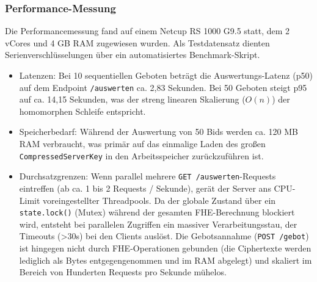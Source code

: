 \subsubsection{Performance-Messung}
Die Performancemessung fand auf einem Netcup RS 1000 G9.5 statt, dem 2 vCores und 4 GB RAM zugewiesen wurden. Als Testdatensatz dienten Serienverschlüsselungen über ein automatisiertes Benchmark-Skript.
\begin{itemize}
    \item Latenzen: Bei 10 sequentiellen Geboten beträgt die Auswertungs-Latenz (p50) auf dem Endpoint \verb|/auswerten| ca. 2,83 Sekunden. Bei 50 Geboten steigt p95 auf ca. 14,15 Sekunden, was der streng linearen Skalierung ($O(n)$) der homomorphen Schleife entspricht.
    \item Speicherbedarf: Während der Auswertung von 50 Bids werden ca. 120 MB RAM verbraucht, was primär auf das einmalige Laden des großen \verb|CompressedServerKey| in den Arbeitsspeicher zurückzuführen ist.
    \item Durchsatzgrenzen: Wenn parallel mehrere \verb|GET /auswerten|-Requests eintreffen (ab ca. 1 bis 2 Requests / Sekunde), gerät der Server ans CPU-Limit voreingestellter Threadpools. Da der globale Zustand über ein \verb|state.lock()| (Mutex) während der gesamten FHE-Berechnung blockiert wird, entsteht bei parallelen Zugriffen ein massiver Verarbeitungsstau, der Timeouts (>30s) bei den Clients auslöst. Die Gebotsannahme (\verb|POST /gebot|) ist hingegen nicht durch FHE-Operationen gebunden (die Ciphertexte werden lediglich als Bytes entgegengenommen und im RAM abgelegt) und skaliert im Bereich von Hunderten Requests pro Sekunde mühelos.
\end{itemize}

